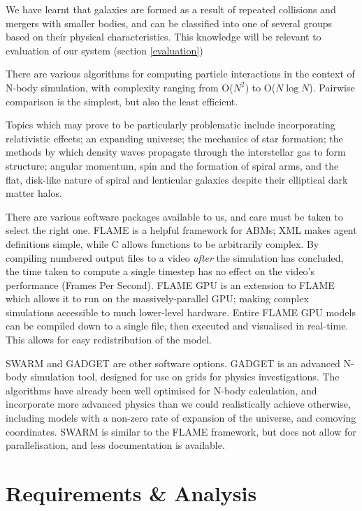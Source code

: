 \documentclass[11pt,a4paper]{article}
\begin{document}
We have learnt that galaxies are formed as a result of repeated collisions and mergers with smaller bodies, and can be classified into one of several groups based on their physical characteristics. This knowledge will be relevant to evaluation of our system (section \ref{evaluation})

There are various algorithms for computing particle interactions in the context of N-body simulation, with complexity ranging from O($N^2$) to O($N \log N$). Pairwise comparison is the simplest, but also the least efficient. 

Topics which may prove to be particularly problematic include incorporating relativistic effects; an expanding universe; the mechanics of star formation; the methods by which density waves propagate through the interstellar gas to form structure; angular momentum, spin and the formation of spiral arms, and the flat, disk-like nature of spiral and lenticular galaxies despite their elliptical dark matter halos.

There are various software packages available to us, and care must be taken to select the right one.
FLAME is a helpful framework for ABMs; XML makes agent definitions simple, while C allows functions to be arbitrarily complex. By compiling numbered output files to a video \emph{after} the simulation has concluded, the time taken to compute a single timestep has no effect on the video's performance (Frames Per Second). FLAME GPU is an extension to FLAME which allows it to run on the massively-parallel GPU; making complex simulations accessible to much lower-level hardware. Entire FLAME GPU models can be compiled down to a single file, then executed and visualised in real-time. This allows for easy redistribution of the model.

SWARM and GADGET are other software options. GADGET is an advanced N-body simulation tool, designed for use on grids for physics investigations. The algorithms have already been well optimised for N-body calculation, and incorporate more advanced physics than we could realistically achieve otherwise, including models with a non-zero rate of expansion of the universe, and comoving coordinates. SWARM is similar to the FLAME framework, but does not allow for parallelisation, and less documentation is available.

\section{Requirements \& Analysis}
\label{Requirements}
\end{document}
